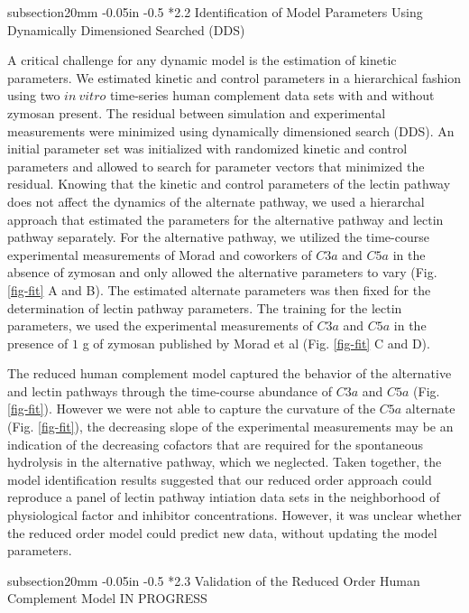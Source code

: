 \documentclass[12pt]{article}
\makeatletter
\renewcommand\subsection{\@startsection
	{subsection}{2}{0mm}
	{-0.05in}
	{-0.5\baselineskip}
	{\normalfont\normalsize\bfseries}}
\makeatother
\begin{document}
\subsection*{2.2 Identification of Model Parameters Using Dynamically Dimensioned Searched (DDS)}

A critical challenge for any dynamic model is the estimation of kinetic parameters. We estimated
kinetic and control parameters in a hierarchical fashion using  two $in~vitro$ time-series human complement data sets with and without zymosan present. The residual between simulation and experimental measurements were minimized  using dynamically dimensioned search (DDS). An initial parameter set was initialized with randomized kinetic and control parameters and allowed to search for parameter vectors that minimized the residual. Knowing that the kinetic and control parameters of the lectin pathway does not affect the dynamics of the alternate pathway, we used a hierarchal approach that estimated the parameters for the alternative pathway and lectin pathway separately. For the alternative pathway, we utilized the time-course experimental measurements of Morad and coworkers \cite{morad2015time} of $C3a$ and $C5a$ in the absence of zymosan and only allowed the alternative parameters to vary (Fig. \ref{fig-fit} A and B). The estimated alternate parameters was then fixed for the determination of lectin pathway parameters. The training for the lectin parameters, we used the experimental measurements of $C3a$ and $C5a$ in the presence of $1$ g of zymosan published by Morad et al \cite{morad2015time} (Fig. \ref{fig-fit} C and D). 

The reduced human complement model captured the behavior of the alternative and lectin pathways through the time-course abundance of $C3a$ and $C5a$ (Fig. \ref{fig-fit}). However we were not able to capture the curvature of the $C5a$ alternate (Fig. \ref{fig-fit}), the decreasing slope of the experimental measurements may be an indication of the decreasing cofactors that are required for the spontaneous hydrolysis in the alternative pathway, which we neglected.  Taken together, the model identification results suggested that our reduced order approach could reproduce a panel of lectin pathway intiation data sets in the neighborhood of physiological factor and inhibitor concentrations. However, it was unclear whether the reduced order model could predict new data, without updating the model parameters.

\subsection*{2.3 Validation of the Reduced Order Human Complement Model}
IN PROGRESS
\end{document}

